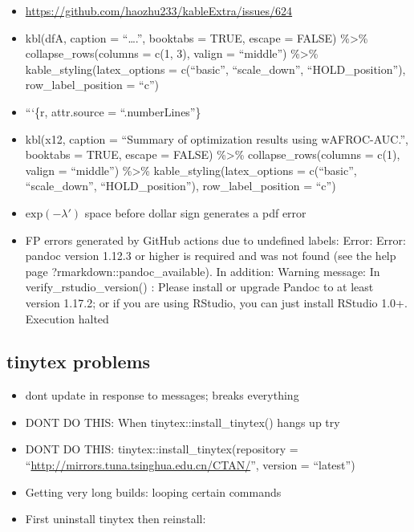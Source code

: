 \documentclass[
]{book}
\providecommand{\tightlist}{%
  \setlength{\itemsep}{0pt}\setlength{\parskip}{0pt}}
\begin{document}
\begin{itemize}
\tightlist
\item
  \url{https://github.com/haozhu233/kableExtra/issues/624}
\item
  kbl(dfA, caption = ``\ldots.'', booktabs = TRUE, escape = FALSE) \%\textgreater\% collapse\_rows(columns = c(1, 3), valign = ``middle'') \%\textgreater\% kable\_styling(latex\_options = c(``basic'', ``scale\_down'', ``HOLD\_position''), row\_label\_position = ``c'')
\item
  ```\{r, attr.source = ``.numberLines''\}
\item
  kbl(x12, caption = ``Summary of optimization results using wAFROC-AUC.'', booktabs = TRUE, escape = FALSE) \%\textgreater\% collapse\_rows(columns = c(1), valign = ``middle'') \%\textgreater\% kable\_styling(latex\_options = c(``basic'', ``scale\_down'', ``HOLD\_position''), row\_label\_position = ``c'')
\item
  \(\text{exp} \left ( -\lambda' \right )\) space before dollar sign generates a pdf error
\item
  FP errors generated by GitHub actions due to undefined labels:
  Error: Error: pandoc version 1.12.3 or higher is required and was not found (see the help page ?rmarkdown::pandoc\_available).
  In addition: Warning message:
  In verify\_rstudio\_version() :
  Please install or upgrade Pandoc to at least version 1.17.2; or if you are using RStudio, you can just install RStudio 1.0+.
  Execution halted
\end{itemize}

\hypertarget{tinytex-problems}{%
\subsection{tinytex problems}\label{tinytex-problems}}

\begin{itemize}
\tightlist
\item
  dont update in response to messages; breaks everything
\item
  DONT DO THIS: When tinytex::install\_tinytex() hangs up try
\item
  DONT DO THIS: tinytex::install\_tinytex(repository = ``\url{http://mirrors.tuna.tsinghua.edu.cn/CTAN/}'', version = ``latest'')
\item
  Getting very long builds: looping certain commands
\item
  First uninstall tinytex then reinstall:
\end{itemize}
\end{document}
